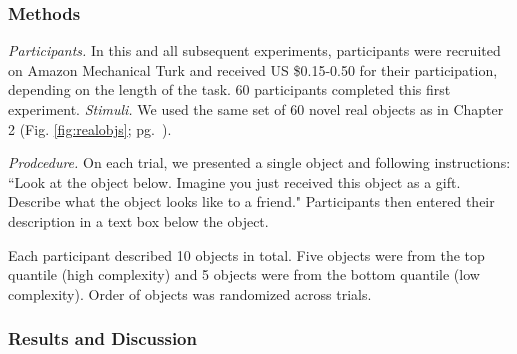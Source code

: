\subsubsection{Methods}
{\it Participants.} 
In this and all subsequent experiments, participants were recruited on Amazon Mechanical Turk and received US \$0.15-0.50 for their participation, depending on the length of the task. 60 participants completed this first experiment.
{\it Stimuli.} 
We used the same set of 60 novel real objects as in Chapter 2 (Fig. \ref{fig:realobjs}; pg.\ \pageref{fig:realobjs}).

{\it Prodcedure.} 
On each trial, we presented a single object and following instructions:  ``Look at the object below. Imagine you just received this object as a gift. Describe what the object looks like to a friend." Participants then entered their description in a text box below the object.

Each participant described 10 objects in total. Five objects were from the top quantile (high complexity) and 5 objects were from the bottom quantile (low complexity). Order of objects was randomized across trials.

\subsubsection{Results and Discussion}


